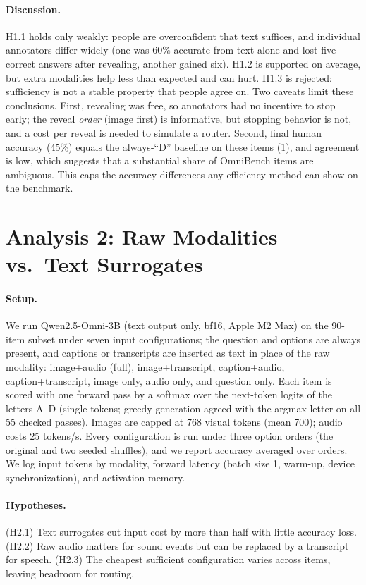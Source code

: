 \documentclass{article}
\begin{document}
\paragraph{Discussion.} H1.1 holds only weakly: people are overconfident that
text suffices, and individual annotators differ widely (one was 60\% accurate
from text alone and lost five correct answers after revealing, another gained
six). H1.2 is supported on average, but extra modalities help less than
expected and can hurt. H1.3 is rejected: sufficiency is not a stable property
that people agree on. Two caveats limit these conclusions. First, revealing was
free, so annotators had no incentive to stop early; the reveal \emph{order}
(image first) is informative, but stopping behavior is not, and a cost per reveal
is needed to simulate a router. Second, final human accuracy (45\%) equals the
always-``D'' baseline on these items (\cref{sec:a2}), and agreement is low,
which suggests that a substantial share of OmniBench items are ambiguous. This
caps the accuracy differences any efficiency method can show on the benchmark.

\section{Analysis 2: Raw Modalities vs.\ Text Surrogates}
\label{sec:a2}

\paragraph{Setup.} We run Qwen2.5-Omni-3B (text output only, bf16, Apple M2 Max)
on the 90-item subset under seven input configurations; the question and options
are always present, and captions or transcripts are inserted as text in place of
the raw modality: image+audio (full), image+transcript, caption+audio,
caption+transcript, image only, audio only, and question only. Each item is
scored with one forward pass by a softmax over the next-token logits of the
letters A--D (single tokens; greedy generation agreed with the argmax letter on
all 55 checked passes). Images are capped at 768 visual tokens (mean 700); audio
costs 25 tokens/s. Every configuration is run under three option orders (the
original and two seeded shuffles), and we report accuracy averaged over orders.
We log input tokens by modality, forward latency (batch size 1, warm-up, device
synchronization), and activation memory.

\paragraph{Hypotheses.} (H2.1) Text surrogates cut input cost by more than half
with little accuracy loss. (H2.2) Raw audio matters for sound events but can be
replaced by a transcript for speech. (H2.3) The cheapest sufficient configuration
varies across items, leaving headroom for routing.
\end{document}
